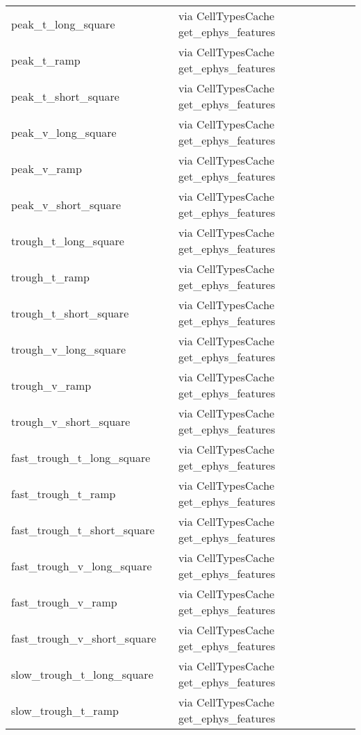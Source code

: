 \documentclass[landscape]{article}
\begin{document}
\begin{longtabu} {X[3,r,p]|X[4,l,p]|X[5,l,p]}
\hline
peak\_t\_long\_square 				&  & via CellTypesCache \textrightarrow get\_ephys\_features  \\
peak\_t\_ramp 						&  & via CellTypesCache \textrightarrow get\_ephys\_features  \\
peak\_t\_short\_square 				&  & via CellTypesCache \textrightarrow get\_ephys\_features  \\
peak\_v\_long\_square 				&  & via CellTypesCache \textrightarrow get\_ephys\_features  \\
peak\_v\_ramp 						&  & via CellTypesCache \textrightarrow get\_ephys\_features  \\
peak\_v\_short\_square 				&  & via CellTypesCache \textrightarrow get\_ephys\_features  \\
\hline
trough\_t\_long\_square 			&  & via CellTypesCache \textrightarrow get\_ephys\_features \\
trough\_t\_ramp 					&  & via CellTypesCache \textrightarrow get\_ephys\_features \\
trough\_t\_short\_square 			&  & via CellTypesCache \textrightarrow get\_ephys\_features \\
trough\_v\_long\_square 			&  & via CellTypesCache \textrightarrow get\_ephys\_features \\
trough\_v\_ramp 					&  & via CellTypesCache \textrightarrow get\_ephys\_features \\
trough\_v\_short\_square 			&  & via CellTypesCache \textrightarrow get\_ephys\_features \\
\hline
fast\_trough\_t\_long\_square 		&  & via CellTypesCache \textrightarrow get\_ephys\_features  \\	
fast\_trough\_t\_ramp 				&  & via CellTypesCache \textrightarrow get\_ephys\_features  \\
fast\_trough\_t\_short\_square 		&  & via CellTypesCache \textrightarrow get\_ephys\_features  \\
fast\_trough\_v\_long\_square 		&  & via CellTypesCache \textrightarrow get\_ephys\_features  \\
fast\_trough\_v\_ramp 				&  & via CellTypesCache \textrightarrow get\_ephys\_features  \\
fast\_trough\_v\_short\_square 		&  & via CellTypesCache \textrightarrow get\_ephys\_features  \\
\hline
slow\_trough\_t\_long\_square 		&  & via CellTypesCache \textrightarrow get\_ephys\_features \\
slow\_trough\_t\_ramp 				&  & via CellTypesCache \textrightarrow get\_ephys\_features \\

\end{longtabu}
\end{document}
